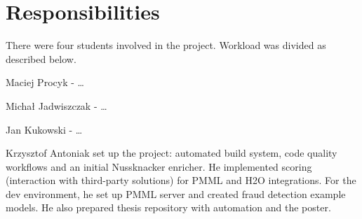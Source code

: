 \chapter{Responsibilities}
\label{chap:responsibilities}


There were four students involved in the project.
Workload was divided as described below.

Maciej Procyk - \dots

Michał Jadwiszczak - \dots

Jan Kukowski - \dots

Krzysztof Antoniak set up the project: automated build system, code quality workflows and an initial Nussknacker enricher.
He implemented scoring (interaction with third-party solutions) for PMML and H2O integrations.
For the dev environment, he set up PMML server and created fraud detection example models.
He also prepared thesis repository with automation and the poster.
